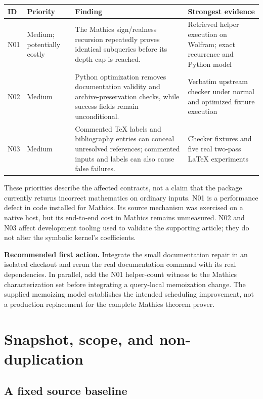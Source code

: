 \documentclass[11pt,letterpaper]{article}
\begin{document}
\begin{center}\small
\begin{tabularx}{\textwidth}{@{}p{.43in}p{.68in}Yp{1.37in}@{}}
\toprule
ID & Priority & Finding & Strongest evidence\\
\midrule
N01 & Medium; potentially costly & The Mathics sign/realness recursion repeatedly proves identical subqueries before its depth cap is reached. & Retrieved helper execution on Wolfram; exact recurrence and Python model\\
N02 & Medium & Python optimization removes documentation validity and archive-preservation checks, while success fields remain unconditional. & Verbatim upstream checker under normal and optimized fixture execution\\
N03 & Medium & Commented TeX labels and bibliography entries can conceal unresolved references; commented inputs and labels can also cause false failures. & Checker fixtures and five real two-pass LaTeX experiments\\
\bottomrule
\end{tabularx}
\end{center}

These priorities describe the affected contracts, not a claim that the package currently returns incorrect mathematics on ordinary inputs. N01 is a performance defect in code installed for Mathics. Its source mechanism was exercised on a native host, but its end-to-end cost in Mathics remains unmeasured. N02 and N03 affect development tooling used to validate the supporting article; they do not alter the symbolic kernel's coefficients.

\textbf{Recommended first action.} Integrate the small documentation repair in an isolated checkout and rerun the real documentation command with its real dependencies. In parallel, add the N01 helper-count witness to the Mathics characterization set before integrating a query-local memoization change. The supplied memoizing model establishes the intended scheduling improvement, not a production replacement for the complete Mathics theorem prover.

\section{Snapshot, scope, and non-duplication}
\subsection{A fixed source baseline}
\end{document}

